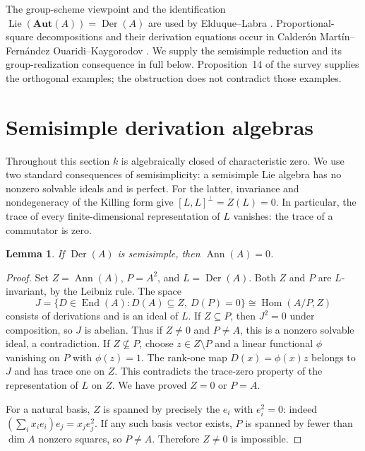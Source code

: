 \documentclass[11pt]{article}
\newtheorem{lemma}[theorem]{Lemma}
\DeclareMathOperator{\Der}{Der}
\DeclareMathOperator{\Ann}{Ann}
\DeclareMathOperator{\Lie}{Lie}
\newcommand{\AutS}{\mathbf{Aut}}
\begin{document}
The group-scheme viewpoint and the identification
$\Lie(\AutS(A))=\Der(A)$ are used by Elduque--Labra
\cite[Introduction and \S4]{el}. Proportional-square decompositions and
their derivation equations occur in Calder\'on Mart\'in--Fern\'andez
Ouaridi--Kaygorodov \cite[\S5, initial derivation equations]{cfk}.
We supply the semisimple reduction and its group-realization consequence in
full below. Proposition~14 of the survey supplies the orthogonal examples;
the obstruction does not contradict those examples.

\section{Semisimple derivation algebras}
Throughout this section $k$ is algebraically closed of characteristic zero.
We use two standard consequences of semisimplicity: a semisimple Lie algebra
has no nonzero solvable ideals and is perfect. For the latter, invariance
and nondegeneracy of the Killing form give
$[L,L]^\perp=Z(L)=0$. In particular, the trace of every finite-dimensional
representation of $L$ vanishes: the trace of a commutator is zero.

\begin{lemma}\label{lem:ann}
If $\Der(A)$ is semisimple, then $\Ann(A)=0$.
\end{lemma}
\begin{proof}
Set $Z=\Ann(A)$, $P=A^2$, and $L=\Der(A)$.
Both $Z$ and $P$ are $L$-invariant, by the Leibniz rule.
The space
\[
 J=\{D\in\operatorname{End}(A):D(A)\subseteq Z,\ D(P)=0\}
       \cong\operatorname{Hom}(A/P,Z)
\]
consists of derivations and is an ideal of $L$.
If $Z\subseteq P$, then $J^2=0$ under composition, so $J$ is abelian.
Thus if $Z\ne0$ and $P\ne A$, this is a nonzero solvable ideal, a contradiction.
If $Z\not\subseteq P$, choose $z\in Z\setminus P$ and a linear functional
$\phi$ vanishing on $P$ with $\phi(z)=1$.
The rank-one map $D(x)=\phi(x)z$ belongs to $J$ and has trace one on $Z$.
This contradicts the trace-zero property of the representation of $L$ on $Z$.
We have proved $Z=0$ or $P=A$.

For a natural basis, $Z$ is spanned by precisely the $e_i$ with $e_i^2=0$:
indeed $(\sum_i x_i e_i)e_j=x_j e_j^2$.
If any such basis vector exists, $P$ is spanned by fewer than $\dim A$
nonzero squares, so $P\ne A$. Therefore $Z\ne0$ is impossible.
\end{proof}
\end{document}
